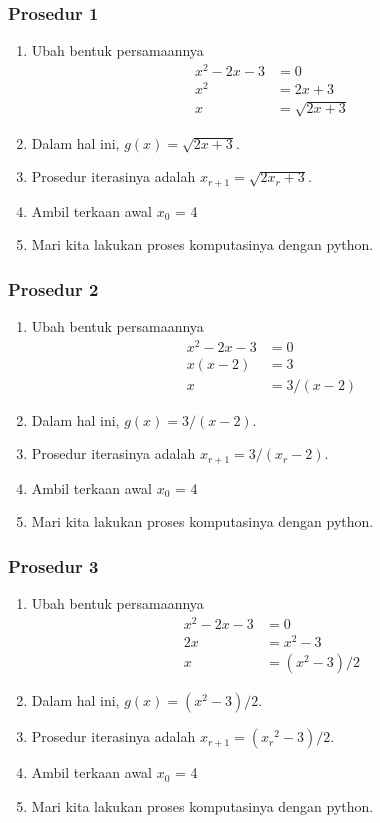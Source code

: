 \documentclass[pdflatex,compress]{beamer}
\begin{document}
\begin{frame}
	\frametitle{Prosedur 1}
	\begin{enumerate}
		\item Ubah bentuk persamaannya
		\begin{align*}
		x^2 - 2x - 3 &= 0 \\
		x^2 &= 2x + 3 \\
		x &= \sqrt{2x + 3}
		\end{align*}
		\item Dalam hal ini, $ g(x) = \sqrt{2x + 3} $.
		\item Prosedur iterasinya adalah $ x_{r+1} = \sqrt{2x_r + 3} $. \item Ambil terkaan awal $ x_0 $ = 4
		\item Mari kita lakukan proses komputasinya dengan python.
	\end{enumerate}
\end{frame}

\begin{frame}
	\frametitle{Prosedur 2}
	\begin{enumerate}
		\item Ubah bentuk persamaannya
		\begin{align*}
		x^2 - 2x - 3 &= 0 \\
		x(x-2) &= 3 \\
		x &= 3/(x-2)
		\end{align*}
		\item Dalam hal ini, $ g(x) = 3/(x-2) $.
		\item Prosedur iterasinya adalah $ x_{r+1} = 3/(x_r-2) $.
		\item Ambil terkaan awal $ x_0 $ = 4
		\item Mari kita lakukan proses komputasinya dengan python.
	\end{enumerate}
\end{frame}

\begin{frame}
	\frametitle{Prosedur 3}
	\begin{enumerate}
		\item Ubah bentuk persamaannya
		\begin{align*}
		x^2 - 2x - 3 &= 0 \\
		2x &= x^2 - 3 \\
		x &= (x^2 - 3)/2
		\end{align*}
		\item Dalam hal ini, $ g(x) = (x^2 - 3)/2 $.
		\item Prosedur iterasinya adalah $ x_{r+1} = ({x_r}^2 - 3)/2 $.
		\item Ambil terkaan awal $ x_0 $ = 4
		\item Mari kita lakukan proses komputasinya dengan python.
	\end{enumerate}
\end{frame}
\end{document}
